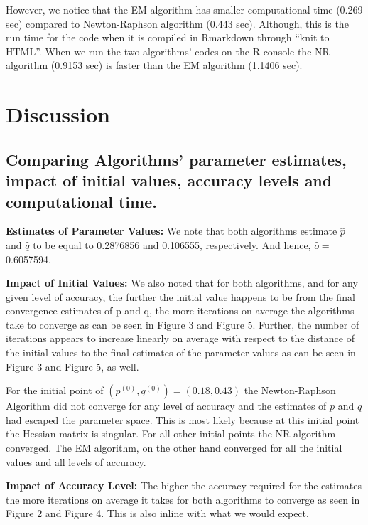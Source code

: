 \documentclass[]{article}
\begin{document}
However, we notice that the EM algorithm has smaller computational time
(0.269 sec) compared to Newton-Raphson algorithm (0.443 sec). Although,
this is the run time for the code when it is compiled in Rmarkdown
through ``knit to HTML''. When we run the two algorithms' codes on the R
console the NR algorithm (0.9153 sec) is faster than the EM algorithm
(1.1406 sec).

\section{Discussion}\label{discussion}

\subsection{Comparing Algorithms' parameter estimates, impact of initial
values, accuracy levels and computational
time.}\label{comparing-algorithms-parameter-estimates-impact-of-initial-values-accuracy-levels-and-computational-time.}

\textbf{Estimates of Parameter Values:} We note that both algorithms
estimate \(\hat{p}\) and \(\hat{q}\) to be equal to 0.2876856 and
0.106555, respectively. And hence, \(\hat{o}=\) 0.6057594.

\textbf{Impact of Initial Values:} We also noted that for both
algorithms, and for any given level of accuracy, the further the initial
value happens to be from the final convergence estimates of p and q, the
more iterations on average the algorithms take to converge as can be
seen in Figure 3 and Figure 5. Further, the number of iterations appears
to increase linearly on average with respect to the distance of the
initial values to the final estimates of the parameter values as can be
seen in Figure 3 and Figure 5, as well.

For the initial point of \((p^{(0)}, q^{(0)}) = (0.18, 0.43)\) the
Newton-Raphson Algorithm did not converge for any level of accuracy and
the estimates of \(p\) and \(q\) had escaped the parameter space. This
is most likely because at this initial point the Hessian matrix is
singular. For all other initial points the NR algorithm converged. The
EM algorithm, on the other hand converged for all the initial values and
all levels of accuracy.

\textbf{Impact of Accuracy Level:} The higher the accuracy required for
the estimates the more iterations on average it takes for both
algorithms to converge as seen in Figure 2 and Figure 4. This is also
inline with what we would expect.
\end{document}
